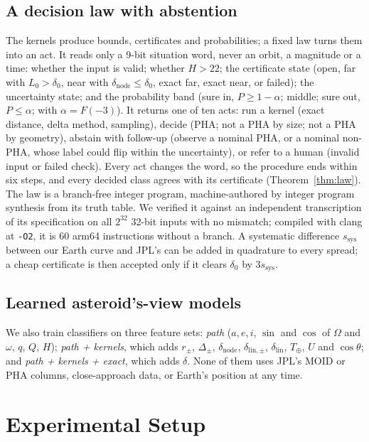 \documentclass[make,article,submit,moreauthors]{Definitions/mdpi}
\begin{document}
\subsection{A decision law with abstention}
\label{sec:law}
The kernels produce bounds, certificates and probabilities; a fixed law turns them into an act. It reads only a 9-bit situation word, never an orbit, a magnitude or a time: whether the input is valid; whether $H > 22$; the certificate state (open, far with $L_0 > \delta_0$, near with $\delta_{\mathrm{node}} \le \delta_0$, exact far, exact near, or failed); the uncertainty state; and the probability band (sure in, $P \ge 1 - \alpha$; middle; sure out, $P \le \alpha$; with $\alpha = F(-3)$). It returns one of ten acts: run a kernel (exact distance, delta method, sampling), decide (PHA; not a PHA by size; not a PHA by geometry), abstain with follow-up (observe a nominal PHA, or a nominal non-PHA, whose label could flip within the uncertainty), or refer to a human (invalid input or failed check). Every act changes the word, so the procedure ends within six steps, and every decided class agrees with its certificate (Theorem~\ref{thm:law}). The law is a branch-free integer program, machine-authored by integer program synthesis from its truth table. We verified it against an independent transcription of its specification on all $2^{32}$ 32-bit inputs with no mismatch; compiled with clang at \texttt{-O2}, it is 60 arm64 instructions without a branch. A systematic difference $s_{\mathrm{sys}}$ between our Earth curve and JPL's can be added in quadrature to every spread; a cheap certificate is then accepted only if it clears $\delta_0$ by $3s_{\mathrm{sys}}$.

\subsection{Learned asteroid's-view models}
We also train classifiers on three feature sets: \emph{path} ($a, e, i$, $\sin$ and $\cos$ of $\Omega$ and $\omega$, $q$, $Q$, $H$); \emph{path + kernels}, which adds $r_\pm$, $\Delta_\pm$, $\delta_{\mathrm{node}}$, $\delta_{\mathrm{lin},\pm}$, $\delta_{\mathrm{lin}}$, $T_\oplus$, $U$ and $\cos\theta$; and \emph{path + kernels + exact}, which adds $\delta$. None of them uses JPL's MOID or PHA columns, close-approach data, or Earth's position at any time.

\section{Experimental Setup}
\end{document}
